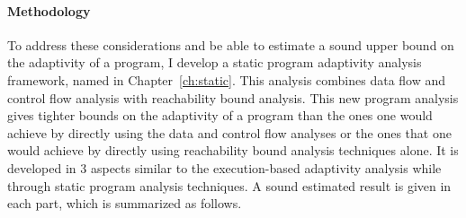 \paragraph{Methodology}
To address these considerations and be able to estimate a sound upper bound on the adaptivity of a program, 
I develop a static program adaptivity analysis framework, named {\THESYSTEM} in Chapter~\ref{ch:static}.
This analysis combines data flow and control flow analysis with reachability bound analysis.
This new program analysis gives tighter bounds on the adaptivity of a program than the ones one would achieve 
by directly using the data and control flow analyses or the ones that one would achieve 
by directly using reachability bound analysis techniques alone. 
It is developed in 3 aspects similar to the execution-based adaptivity analysis 
while through static program analysis techniques. 
A sound estimated result is given in each part, which is summarized as follows.
